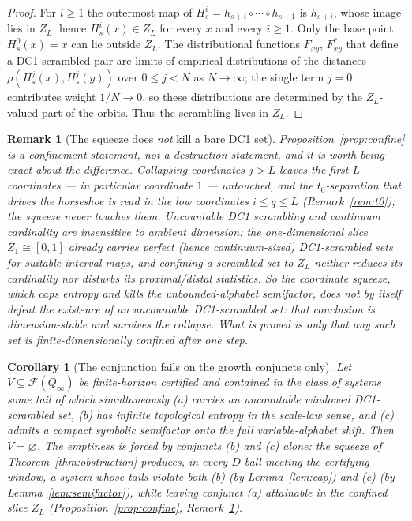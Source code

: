 \documentclass[11pt]{article}
\newtheorem{corollary}[theorem]{Corollary}
\newtheorem{remark}[theorem]{Remark}
\newcommand{\Q}{Q_\infty}
\newcommand{\F}{\mathcal{F}}
\begin{document}
\begin{proof}
For $i\ge1$ the outermost map of $H^i_s=h_{s+i}\circ\cdots\circ h_{s+1}$ is $h_{s+i}$,
whose image lies in $Z_L$; hence $H^i_s(x)\in Z_L$ for every $x$ and every $i\ge1$.  Only
the base point $H^0_s(x)=x$ can lie outside $Z_L$.  The distributional functions
$F_{xy}$, $F^*_{xy}$ that define a DC1-scrambled pair are limits of empirical
distributions of the distances $\rho(H^j_s(x),H^j_s(y))$ over $0\le j<N$ as
$N\to\infty$; the single term $j=0$ contributes weight $1/N\to0$, so these distributions
are determined by the $Z_L$-valued part of the orbits.  Thus the scrambling lives in
$Z_L$.
\end{proof}

\begin{remark}[The squeeze does \emph{not} kill a bare DC1 set]\label{rem:dc1-honest}
Proposition~\ref{prop:confine} is a confinement statement, not a destruction statement,
and it is worth being exact about the difference.  Collapsing coordinates $j>L$ leaves the
first $L$ coordinates --- in particular coordinate $1$ --- untouched, and the
$t_0$-separation that drives the horseshoe is read in the low coordinates $i\le q\le L$
(Remark~\ref{rem:t0}); the squeeze never touches them.  Uncountable DC1 scrambling and
continuum cardinality are insensitive to ambient dimension: the one-dimensional slice
$Z_1\cong[0,1]$ already carries perfect (hence continuum-sized) DC1-scrambled sets for
suitable interval maps, and confining a scrambled set to $Z_L$ neither reduces its
cardinality nor disturbs its proximal/distal statistics.  So the coordinate squeeze, which
caps entropy and kills the unbounded-alphabet semifactor, does \emph{not} by itself defeat
the existence of an uncountable DC1-scrambled set: that conclusion is dimension-stable and
survives the collapse.  What is proved is only that any such set is finite-dimensionally
confined after one step.
\end{remark}

\begin{corollary}[The conjunction fails on the growth conjuncts only]\label{cor:bundle}
Let $V\subseteq\F(\Q)$ be finite-horizon certified and contained in the class of systems
some tail of which simultaneously (a) carries an uncountable windowed DC1-scrambled set,
(b) has infinite topological entropy in the scale-law sense, and (c) admits a compact
symbolic semifactor onto the full variable-alphabet shift.  Then $V=\varnothing$.  The
emptiness is forced by conjuncts \emph{(b)} and \emph{(c)} alone: the squeeze of
Theorem~\ref{thm:obstruction} produces, in every $D$-ball meeting the certifying window, a
system whose tails violate both (b) (by Lemma~\ref{lem:cap}) and (c) (by
Lemma~\ref{lem:semifactor}), while leaving conjunct (a) attainable in the confined slice
$Z_L$ (Proposition~\ref{prop:confine}, Remark~\ref{rem:dc1-honest}).
\end{corollary}
\end{document}

